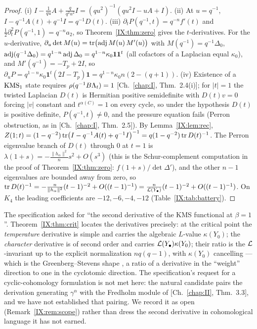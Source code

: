 \begin{proof}
(i) $I-\frac1{qu}A+\frac{q}{q^{2}u^{2}}I=(qu^{2})^{-1}(qu^{2}I-uA+I)$. (ii) At $u=q^{-1}$,
$I-q^{-1}A(t)+q^{-1}I=q^{-1}D(t)$. (iii) $\partial_tP(q^{-1},t)=q^{-n}f'(t)$ and
$\frac12\partial_t^{2}P(q^{-1},1)=q^{-n}a_2$, so Theorem~\ref{IX:thm:zero} gives the
$t$-derivatives. For the $u$-derivative, $\partial_u\det M(u)=\operatorname{tr}\bigl(\operatorname{adj} M(u)\,M'(u)\bigr)$
with $M(q^{-1})=q^{-1}\Delta_0$, $\operatorname{adj}(q^{-1}\Delta_0)=q^{1-n}\operatorname{adj}\Delta_0
=q^{1-n}\kappa_0\mathbf1\mathbf1^{t}$ (all cofactors of a Laplacian equal $\kappa_0$),
and $M'(q^{-1})=-T_p+2I$, so $\partial_uP=q^{1-n}\kappa_0\mathbf1^{t}(2I-T_p)\mathbf1
=q^{1-n}\kappa_0n(2-(q{+}1))$. (iv) Existence of a $\mathrm{KMS}_1$ state requires
$\rho(q^{-1}B\Lambda_t)=1$ [Ch.~\ref{chap:I}, Thm.~2.4(i)]; for $|t|=1$ the twisted Laplacian $D(t)$ is
Hermitian positive semidefinite with $D(t)v=0$ forcing $|v|$ constant and
$t^{\alpha(C)}=1$ on every cycle, so under the hypothesis $D(t)$ is positive definite,
$P(q^{-1},t)\neq0$, and the pressure equation fails (Perron obstruction, as in
[Ch.~\ref{chap:I}, Thm.~2.5]). By Lemma~\ref{IX:lem:rec},
$Z(1;t)=(1-q^{-2})\operatorname{tr}\bigl(I-q^{-1}A(t)+q^{-1}I\bigr)^{-1}=q(1-q^{-2})\operatorname{tr} D(t)^{-1}$.
The Perron eigenvalue branch of $D(t)$ through $0$ at $t=1$ is
$\lambda(1+s)=-\frac{\|h_\alpha\|^{2}}{n}s^{2}+O(s^{3})$ (this is the Schur-complement
computation in the proof of Theorem~\ref{IX:thm:zero}: $f(1+s)/\det\Delta'$), and the other
$n-1$ eigenvalues are bounded away from zero, so $\operatorname{tr} D(t)^{-1}=
-\frac{n}{\|h_\alpha\|^{2}}(t-1)^{-2}+O((t-1)^{-1})=\frac{n}{\mathcal{L}(Y_\bullet)}(t-1)^{-2}
+O((t-1)^{-1})$. On $K_4$ the leading coefficients are $-12,-6,-4,-12$
(Table~\ref{IX:tab:battery}).
\end{proof}

\begin{remark}\label{IX:rem:whichderivative}
The specification asked for ``the second derivative of the KMS functional at $\beta=1$''.
Theorem~\ref{IX:thm:crit} locates the derivatives precisely: at the critical point the
\emph{temperature} derivative is simple and carries the algebraic $L$-value
$\kappa(Y_0)$; the \emph{character} derivative is of second order and carries
$\mathcal{L}(Y_\bullet)\kappa(Y_0)$; their ratio is the $\mathcal{L}$-invariant up to the explicit
normalization $nq(q-1)$, with $\kappa(Y_0)$ cancelling --- which is the Greenberg--Stevens
shape \cite{GS}, a ratio of a derivative in the ``weight'' direction to one in the
cyclotomic direction. The specification's request for a cyclic-cohomology formulation
is not met here: the natural candidate pairs the derivation generating $\gamma^{\alpha}$
with the Fredholm module of [Ch.~\ref{chap:II}, Thm.~3.3], and we have not established that pairing.
We record it as open (Remark~\ref{IX:rem:scope}) rather than dress the second derivative in
cohomological language it has not earned.
\end{remark}

